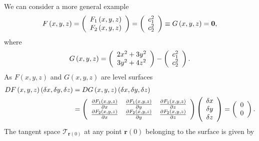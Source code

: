 \documentclass[aps,preprint]{revtex4}%
\begin{document}
We can consider a more general example
\begin{equation}
F\left(  x,y,z\right)  =\left(
\begin{array}
[c]{c}%
F_{1}\left(  x,y,z\right) \\
F_{2}\left(  x,y,z\right)
\end{array}
\right)  =\left(
\begin{array}
[c]{c}%
c_{1}^{2}\\
c_{2}^{2}%
\end{array}
\right)  \equiv G\left(  x,y,z\right)  =\mathbf{0},
\end{equation}
where
\begin{equation}
G\left(  x,y,z\right)  =\left(
\begin{array}
[c]{c}%
2x^{2}+3y^{2}\\
3y^{2}+4z^{2}%
\end{array}
\right)  -\left(
\begin{array}
[c]{c}%
c_{1}^{2}\\
c_{2}^{2}%
\end{array}
\right)  .
\end{equation}
As $F\left(  x,y,z\right)  $ and $G\left(  x,y,z\right)  $ are level surfaces
\begin{align}
DF\left(  x,y,z\right)  \left(  \delta x,\delta y,\delta z\right)   &
=DG\left(  x,y,z\right)  \left(  \delta x,\delta y,\delta z\right) \nonumber\\
&  =\left(
\begin{array}
[c]{ccc}%
\frac{\partial F_{1}\left(  x,y,z\right)  }{\partial x} & \frac{\partial
F_{1}\left(  x,y,z\right)  }{\partial y} & \frac{\partial F_{1}\left(
x,y,z\right)  }{\partial z}\\
\frac{\partial F_{2}\left(  x,y,z\right)  }{\partial x} & \frac{\partial
F_{2}\left(  x,y,z\right)  }{\partial y} & \frac{\partial F_{2}\left(
x,y,z\right)  }{\partial z}%
\end{array}
\right)  \left(
\begin{array}
[c]{c}%
\delta x\\
\delta y\\
\delta z
\end{array}
\right)  =\left(
\begin{array}
[c]{c}%
0\\
0
\end{array}
\right)  .
\end{align}
The tangent space $\mathcal{T}_{\mathbf{r}\left(  0\right)  }$ at any point
$\mathbf{r}\left(  0\right)  $ belonging to the surface is given by
\end{document}
